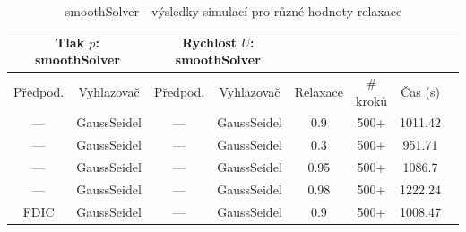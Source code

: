 \documentclass[a4paper,12pt]{report}
\theoremstyle{remark}
\begin{document}
\begin{table}[H]
	\centering
	\caption{smoothSolver - výsledky simulací pro různé hodnoty relaxace}
	\renewcommand{\arraystretch}{1.9}
	\begin{tabular}{*8c}
		\toprule
		\multicolumn{2}{c}{Tlak $p$: \textbf{smoothSolver}} & \multicolumn{2}{c}{Rychlost $U$: \textbf{smoothSolver}}\\
		\midrule
		Předpod.&Vyhlazovač&Předpod.&Vyhlazovač&Relaxace&\# kroků&Čas (s)\\
		\midrule
		--- & GaussSeidel &   --- & GaussSeidel &0.9&500+&1011.42\\
		--- & GaussSeidel &  --- & GaussSeidel &0.3&500+&951.71\\
		--- & GaussSeidel &   --- & GaussSeidel &0.95&500+&1086.7\\
		--- & GaussSeidel &  --- & GaussSeidel &0.98&500+&1222.24\\
		FDIC & GaussSeidel &  --- & GaussSeidel &0.9&500+&1008.47\\
		\bottomrule
	\end{tabular}
	\label{table:solvers_set3}
\end{table}
\end{document}
